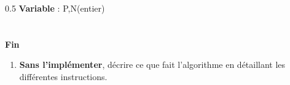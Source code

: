 \begin{boxexstheorieligne}
\vspace{0mm}
\begin{center}
\begin{affichagealgorithme}{0.5}
\textbf{Variable} : P,N(entier)\\
\\
\\
\textbf{Fin}
\end{affichagealgorithme}
\end{center}













%
%
%

\vspace*{-3mm}
\makeatletter
\begin{enumerate}[label=\alph*),itemsep=2mm]
\item \textbf{Sans l'implémenter}, décrire ce que fait l'algorithme en détaillant les différentes instructions.


\end{enumerate}
\end{boxexstheorieligne}
